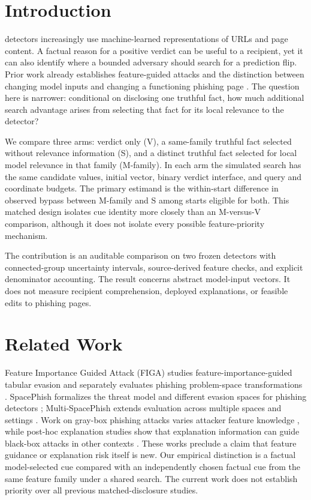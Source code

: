 \documentclass{ieeeaccess}
\begin{document}
\section{Introduction}
 detectors increasingly use machine-learned representations of URLs and page content. A factual reason for a positive verdict can be useful to a recipient, yet it can also identify where a bounded adversary should search for a prediction flip. Prior work already establishes feature-guided attacks and the distinction between changing model inputs and changing a functioning phishing page \cite{figa,spacephish,multispacephish}. The question here is narrower: conditional on disclosing one truthful fact, how much additional search advantage arises from selecting that fact for its local relevance to the detector?

We compare three arms: verdict only (V), a same-family truthful fact selected without relevance information (S), and a distinct truthful fact selected for local model relevance in that family (M-family). In each arm the simulated search has the same candidate values, initial vector, binary verdict interface, and query and coordinate budgets. The primary estimand is the within-start difference in observed bypass between M-family and S among starts eligible for both. This matched design isolates cue identity more closely than an M-versus-V comparison, although it does not isolate every possible feature-priority mechanism.

The contribution is an auditable comparison on two frozen detectors with connected-group uncertainty intervals, source-derived feature checks, and explicit denominator accounting. The result concerns abstract model-input vectors. It does not measure recipient comprehension, deployed explanations, or feasible edits to phishing pages.

\section{Related Work}
Feature Importance Guided Attack (FIGA) studies feature-importance-guided tabular evasion and separately evaluates phishing problem-space transformations \cite{figa}. SpacePhish formalizes the threat model and different evasion spaces for phishing detectors \cite{spacephish}; Multi-SpacePhish extends evaluation across multiple spaces and settings \cite{multispacephish}. Work on gray-box phishing attacks varies attacker feature knowledge \cite{lnuphish}, while post-hoc explanation studies show that explanation information can guide black-box attacks in other contexts \cite{quan}. These works preclude a claim that feature guidance or explanation risk itself is new. Our empirical distinction is a factual model-selected cue compared with an independently chosen factual cue from the same feature family under a shared search. The current work does not establish priority over all previous matched-disclosure studies.
\end{document}
